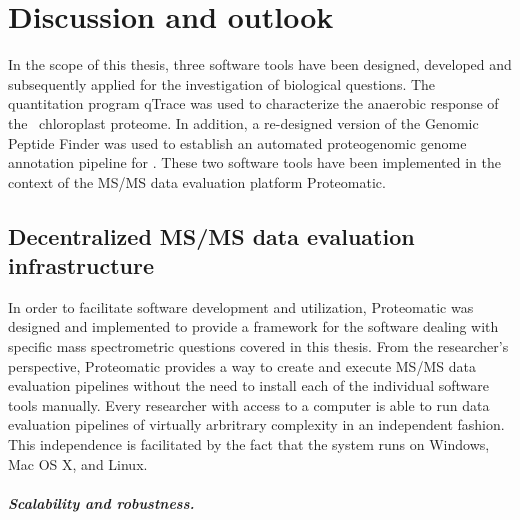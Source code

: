 \cleardoublepage
{}
\chapter{Discussion and outlook}

In the scope of this thesis, three software tools have been designed, 
developed and subsequently applied for the investigation of biological 
questions.
The quantitation program qTrace was used to characterize the anaerobic 
response of the \cre~chloroplast proteome.
In addition, a re-designed version of the Genomic Peptide Finder was used
to establish an automated proteogenomic genome annotation pipeline for \cre.
These two software tools have been implemented in the context of the MS/MS data 
evaluation platform Proteomatic.

\section{Decentralized MS/MS data evaluation infrastructure}

In order to facilitate software development and utilization, Proteomatic
was designed and implemented to provide a framework for the software
dealing with specific mass spectrometric questions covered in this thesis.
From the researcher's perspective, Proteomatic provides a way to create and
execute MS/MS data evaluation pipelines without the need to install each of
the individual software tools manually.
Every researcher with access to a computer is able to run data evaluation
pipelines of virtually arbritrary complexity in an independent fashion.
This independence is facilitated by the fact that the system runs on Windows,
Mac OS X, and Linux.

\paragraph{Scalability and robustness.}

